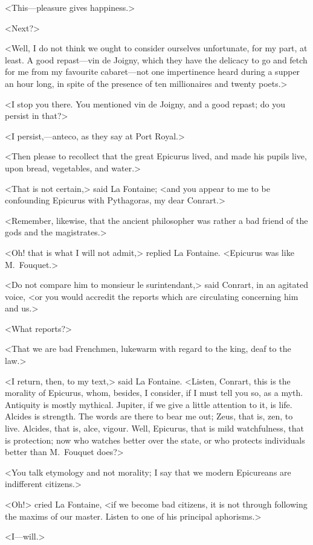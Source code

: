 <This—pleasure gives happiness.>

<Next?>

<Well, I do not think we ought to consider ourselves unfortunate, for my part, at least. A good repast—vin de Joigny, which they have the delicacy to go and fetch for me from my favourite cabaret—not one impertinence heard during a supper an hour long, in spite of the presence of ten millionaires and twenty poets.>

<I stop you there. You mentioned vin de Joigny, and a good repast; do you persist in that?>

<I persist,—anteco, as they say at Port Royal.>

<Then please to recollect that the great Epicurus lived, and made his pupils live, upon bread, vegetables, and water.>

<That is not certain,> said La Fontaine; <and you appear to me to be confounding Epicurus with Pythagoras, my dear Conrart.>

<Remember, likewise, that the ancient philosopher was rather a bad friend of the gods and the magistrates.>

<Oh! that is what I will not admit,> replied La Fontaine. <Epicurus was like M.~Fouquet.>

<Do not compare him to monsieur le surintendant,> said Conrart, in an agitated voice, <or you would accredit the reports which are circulating concerning him and us.>

<What reports?>

<That we are bad Frenchmen, lukewarm with regard to the king, deaf to the law.>

<I return, then, to my text,> said La Fontaine. <Listen, Conrart, this is the morality of Epicurus, whom, besides, I consider, if I must tell you so, as a myth. Antiquity is mostly mythical. Jupiter, if we give a little attention to it, is life. Alcides is strength. The words are there to bear me out; Zeus, that is, zen, to live. Alcides, that is, alce, vigour. Well, Epicurus, that is mild watchfulness, that is protection; now who watches better over the state, or who protects individuals better than M.~Fouquet does?>

<You talk etymology and not morality; I say that we modern Epicureans are indifferent citizens.>

<Oh!> cried La Fontaine, <if we become bad citizens, it is not through following the maxims of our master. Listen to one of his principal aphorisms.>

<I—will.>

